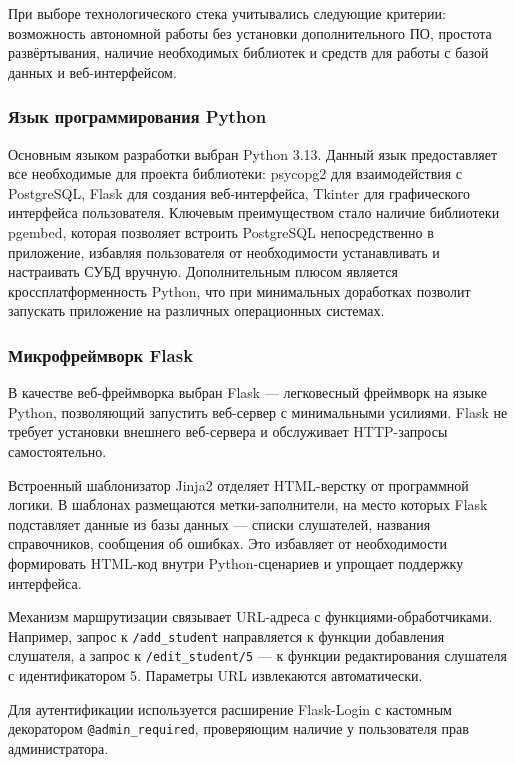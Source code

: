 При выборе технологического стека учитывались следующие критерии: возможность автономной работы без установки дополнительного ПО, простота развёртывания, наличие необходимых библиотек и средств для работы с базой данных и веб-интерфейсом.

\subsubsection{Язык программирования Python}

Основным языком разработки выбран Python 3.13. Данный язык предоставляет все необходимые для проекта библиотеки: psycopg2 для взаимодействия с PostgreSQL, Flask для создания веб-интерфейса, Tkinter для графического интерфейса пользователя. Ключевым преимуществом стало наличие библиотеки pgembed, которая позволяет встроить PostgreSQL непосредственно в приложение, избавляя пользователя от необходимости устанавливать и настраивать СУБД вручную. Дополнительным плюсом является кроссплатформенность Python, что при минимальных доработках позволит запускать приложение на различных операционных системах.

\subsubsection{Микрофреймворк Flask}

В качестве веб-фреймворка выбран Flask — легковесный фреймворк на языке Python, позволяющий запустить веб-сервер с минимальными усилиями. Flask не требует установки внешнего веб-сервера и обслуживает HTTP-запросы самостоятельно.

Встроенный шаблонизатор Jinja2 отделяет HTML-верстку от программной логики. В шаблонах размещаются метки-заполнители, на место которых Flask подставляет данные из базы данных — списки слушателей, названия справочников, сообщения об ошибках. Это избавляет от необходимости формировать HTML-код внутри Python-сценариев и упрощает поддержку интерфейса.

Механизм маршрутизации связывает URL-адреса с функциями-обработчиками. Например, запрос к \texttt{/add\_student} направляется к функции добавления слушателя, а запрос к \texttt{/edit\_student/5} — к функции редактирования слушателя с идентификатором 5. Параметры URL извлекаются автоматически.

Для аутентификации используется расширение Flask-Login с кастомным декоратором \texttt{@admin\_required}, проверяющим наличие у пользователя прав администратора.

